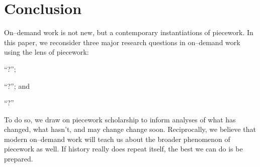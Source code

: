 \documentclass[trackingWork]{subfiles}
\begin{document}
\section{Conclusion}
On--demand work is not new, but a contemporary instantiations of piecework.
In this paper, we reconsider three major research questions in on--demand work using the lens of piecework:
\begin{inlinelist}
  \item ``?'';
  \item ``?''; and
  \item ``?''
\end{inlinelist}
To do so, we draw on piecework scholarship to inform analyses of what has changed, what hasn't, and may change change soon.
Reciprocally, we believe that modern on--demand work will teach us about the broader phenomenon of piecework as well.
If history really does repeat itself, the best we can do is be prepared.
\end{document}
